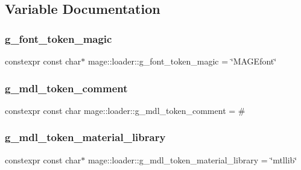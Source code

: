\subsection{Variable Documentation}
\hypertarget{namespacemage_1_1loader_a20d64b38ae4c82f5289faeb28e9e7fad}{}\label{namespacemage_1_1loader_a20d64b38ae4c82f5289faeb28e9e7fad} 
\subsubsection{\texorpdfstring{g\+\_\+font\+\_\+token\+\_\+magic}{g\_font\_token\_magic}}
{\footnotesize\ttfamily constexpr const char$\ast$ mage\+::loader\+::g\+\_\+font\+\_\+token\+\_\+magic = \char`\"{}M\+A\+G\+Efont\char`\"{}}

\hypertarget{namespacemage_1_1loader_aca4ba9456f5233060d09a0f119021168}{}\label{namespacemage_1_1loader_aca4ba9456f5233060d09a0f119021168} 
\subsubsection{\texorpdfstring{g\+\_\+mdl\+\_\+token\+\_\+comment}{g\_mdl\_token\_comment}}
{\footnotesize\ttfamily constexpr const char mage\+::loader\+::g\+\_\+mdl\+\_\+token\+\_\+comment = \textquotesingle{}\#\textquotesingle{}}

\hypertarget{namespacemage_1_1loader_a7a130ab03ceb9d2ff5c0c0a64396366e}{}\label{namespacemage_1_1loader_a7a130ab03ceb9d2ff5c0c0a64396366e} 
\subsubsection{\texorpdfstring{g\+\_\+mdl\+\_\+token\+\_\+material\+\_\+library}{g\_mdl\_token\_material\_library}}
{\footnotesize\ttfamily constexpr const char$\ast$ mage\+::loader\+::g\+\_\+mdl\+\_\+token\+\_\+material\+\_\+library = \char`\"{}mtllib\char`\"{}}

